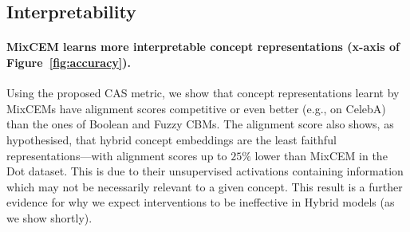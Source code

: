 \subsection{Interpretability}


\paragraph{MixCEM learns more interpretable concept representations (x-axis of Figure~\ref{fig:accuracy}).}
Using the proposed CAS metric, we show that concept representations learnt by MixCEMs have alignment scores competitive or even better (e.g., on CelebA) than the ones of Boolean and Fuzzy CBMs. The alignment score also shows, as hypothesised, that hybrid concept embeddings are the least faithful representations---with alignment scores up to $25\%$ lower than MixCEM in the Dot dataset. This is due to their unsupervised activations containing information which may not be necessarily relevant to a given concept. This result  is a further evidence for why we expect interventions to be ineffective in Hybrid models (as we show shortly).




